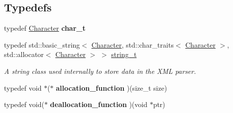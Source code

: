 \subsection*{Typedefs}
\begin{DoxyCompactItemize}
\item 
\hypertarget{namespacephys_1_1xml_afc87705cd1c2917d87b879715a2d8f6e}{
typedef \hyperlink{namespacephys_a3098bae5b0a3cd16eec331f766cc562b}{Character} {\bfseries char\_\-t}}
\label{d9/d27/namespacephys_1_1xml_afc87705cd1c2917d87b879715a2d8f6e}

\item 
\hypertarget{namespacephys_1_1xml_a6db751f2b35502e04c123bb70daa0d20}{
typedef std::basic\_\-string$<$ \hyperlink{namespacephys_a3098bae5b0a3cd16eec331f766cc562b}{Character}, std::char\_\-traits$<$ \hyperlink{namespacephys_a3098bae5b0a3cd16eec331f766cc562b}{Character} $>$, std::allocator$<$ \hyperlink{namespacephys_a3098bae5b0a3cd16eec331f766cc562b}{Character} $>$ $>$ \hyperlink{namespacephys_1_1xml_a6db751f2b35502e04c123bb70daa0d20}{string\_\-t}}
\label{d9/d27/namespacephys_1_1xml_a6db751f2b35502e04c123bb70daa0d20}

\begin{DoxyCompactList}\small\item\em A string class used internally to store data in the XML parser. \item\end{DoxyCompactList}\item 
\hypertarget{namespacephys_1_1xml_a3012ecdd41040d1471217fdac32c76ca}{
typedef void $\ast$($\ast$ {\bfseries allocation\_\-function} )(size\_\-t size)}
\label{d9/d27/namespacephys_1_1xml_a3012ecdd41040d1471217fdac32c76ca}

\item 
\hypertarget{namespacephys_1_1xml_a042e00af30d526d7d17bc4aaa3e7c592}{
typedef void($\ast$ {\bfseries deallocation\_\-function} )(void $\ast$ptr)}
\label{d9/d27/namespacephys_1_1xml_a042e00af30d526d7d17bc4aaa3e7c592}

\end{DoxyCompactItemize}
